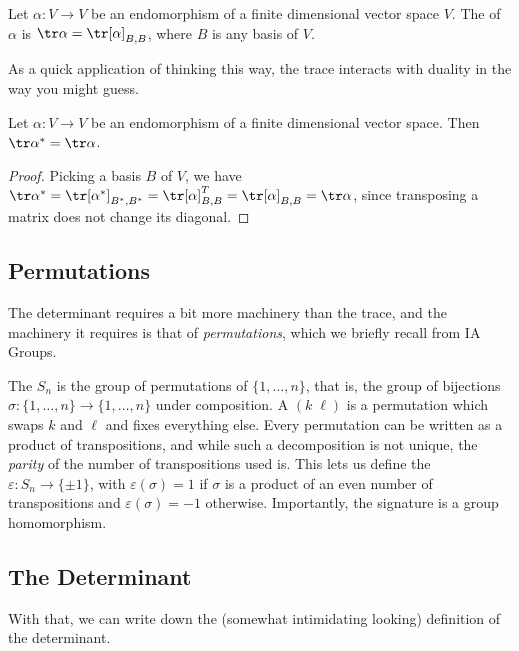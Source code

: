 \begin{definition}
    Let $\alpha: V \rightarrow V$ be an endomorphism of a finite dimensional vector space $V$. The  of $\alpha$ is $\tr \alpha = \tr [\alpha]_{B, B}$, where $B$ is any basis of $V$.
\end{definition}

As a quick application of thinking this way, the trace interacts with duality in the way you might guess.

\begin{lemma}
    Let $\alpha : V \rightarrow V$ be an endomorphism of a finite dimensional vector space. Then $\tr \alpha^* = \tr \alpha$.
\end{lemma}
\begin{proof}
    Picking a basis $B$ of $V$, we have $\tr \alpha^* = \tr [\alpha^*]_{B^*, B^*} = \tr [\alpha]_{B, B}^T = \tr [\alpha]_{B, B} = \tr \alpha$, since transposing a matrix does not change its diagonal.
\end{proof}

\subsection{Permutations}

The determinant requires a bit more machinery than the trace, and the machinery it requires is that of \emph{permutations}, which we briefly recall from IA Groups.

The  $S_n$ is the group of permutations of $\{1, \dots, n\}$, that is, the group of bijections $\sigma: \{1, \dots, n\} \rightarrow \{1, \dots, n\}$ under composition. A  $(k \; \ell)$ is a permutation which swaps $k$ and $\ell$ and fixes everything else. Every permutation can be written as a product of transpositions, and while such a decomposition is not unique, the \emph{parity} of the number of transpositions used is. This lets us define the  $\varepsilon: S_n \rightarrow \{\pm 1\}$, with $\varepsilon(\sigma) = 1$ if $\sigma$ is a product of an even number of transpositions and $\varepsilon(\sigma) = -1$ otherwise. Importantly, the signature is a group homomorphism.

\subsection{The Determinant}

With that, we can write down the (somewhat intimidating looking) definition of the determinant.

